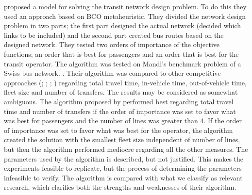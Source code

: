 \citet{nikolic14} proposed a model for solving the transit network design problem. To do this they used an approach based on BCO metaheuristic. They divided the network design problem in two parts; the first part designed the actual network (decided which links to be included) and the second part created bus routes based on the designed network. They tested two orders of importance of the objective functions; an order that is best for passengers and an order that is best for the transit operator. The algorithm was tested on Mandl's benchmark problem of a Swiss bus network\citep{mandl80}. . Their algorithm was compared to other competitive approaches (\citet{mandl80}; \citet{shih94}; \citet{baaj95}; \citet{bagloee11}) regarding total travel time, in-vehicle time, out-of-vehicle time, fleet size and number of transfers. The results may be considered as somewhat ambiguous. The algorithm proposed by \citet{nikolic14} performed best regarding total travel time and number of transfers if the order of importance was set to favor what was best for passengers and the number of lines was greater than 4. If the order of importance was set to favor what was best for the operator, the algorithm created the solution with the smallest fleet size independent of number of lines, but then the algorithm performed mediocre regarding all the other measures. The parameters used by the algorithm is described, but not justified. This makes the experiments feasible to replicate, but the process of determining the parameters infeasible to verify. The algorithm is compared with what we classify as relevant research, which clarifies both the strengths and weaknesses of their algorithm. 

